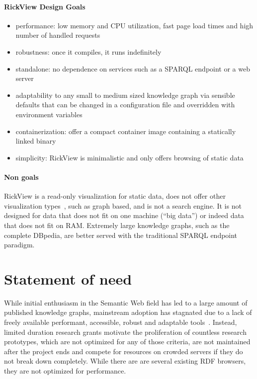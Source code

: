 \documentclass[a4paper,10pt]{article}
\begin{document}
\paragraph{RickView Design Goals}
\begin{itemize}
\item
  performance: low memory and CPU utilization, fast page load times and high number of handled requests
\item
  robustness: once it compiles, it runs indefinitely
\item
  standalone: no dependence on services such as a SPARQL endpoint or a web server
\item
  adaptability to any small to medium sized knowledge graph via sensible defaults that can be changed in a configuration file and overridden with environment variables
\item
  containerization: offer a compact container image containing a statically linked binary
\item
  simplicity: RickView is minimalistic and only offers browsing of static data
\end{itemize}

\paragraph{Non goals}
RickView is a read-only visualization for static data, does not offer other visualization types~\citep{linkeddatavisualization}, such as graph based, and is not a search engine.
It is not designed for data that does not fit on one machine (\enquote{big data}) or indeed data that does not fit on RAM.
Extremely large knowledge graphs, such as the complete DBpedia, are better served with the traditional SPARQL endpoint paradigm.

\section{Statement of need}\label{statement-of-need}

While initial enthusiasm in the Semantic Web field has led to a large amount of published knowledge graphs, mainstream adoption has stagnated due to a lack of freely available performant, accessible, robust and adaptable tools~\citep{semanticwebreview}.
Instead, limited duration research grants motivate the proliferation of countless research prototypes, which are not optimized for any of those criteria, are not maintained after the project ends and compete for resources on crowded servers if they do not break down completely.
While there are are several existing RDF browsers, they are not optimized for performance.
\end{document}
